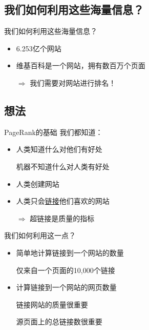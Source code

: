 \subsection{我们如何利用这些海量信息？}
\begin{frame}{我们如何利用这些海量信息？}
    \begin{itemize}[<+->]
        \item 6.253亿个网站
        \item 维基百科是一个网站，拥有数百万个页面
        \item[$\Rightarrow$] 我们需要对网站进行排名！
    \end{itemize}
\end{frame}

\subsection{想法}
\begin{frame}{PageRank的基础}
    我们都知道：
    \begin{itemize}[<+->]
        \item 人类知道什么对他们有好处
        \item[\xmark] 机器不知道什么对人类有好处
        \item 人类创建网站
        \item 人类只会\href{http://en.wikipedia.org/wiki/Hyperlink}{链接}他们喜欢的网站
        \item[$\Rightarrow$] 超链接是质量的指标
    \end{itemize}
\end{frame}

\begin{frame}{我们如何利用这一点？}
    \begin{itemize}[<+->]
        \item 简单地计算链接到一个网站的数量
        \item[\xmark] 仅来自一个页面的10,000个链接
        \item 计算链接到一个网站的网页数量
        \item[\xmark] 链接网站的质量很重要
        \item[\xmark] 源页面上的总链接数很重要
    \end{itemize}
\end{frame}


